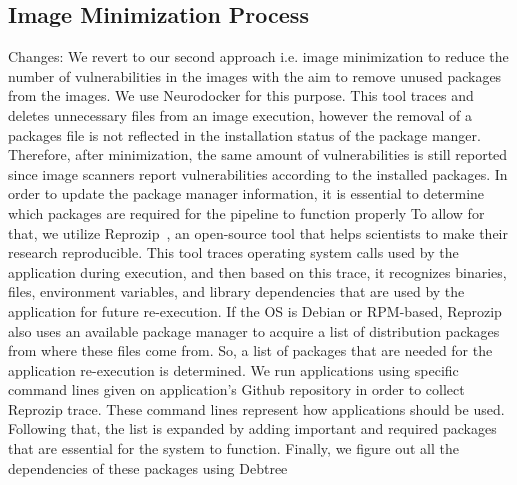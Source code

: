 \documentclass[a4paper,num-refs]{oup-contemporary}
\newcommand{\change}[2]{\color{cyan}Changes: #1\color{black}}
\begin{document}
\subsection{Image Minimization Process}

\change{We revert to our second approach i.e. image minimization to reduce the number of vulnerabilities in the
images with the aim to remove unused packages from the images.
We use Neurodocker for this purpose.
This tool traces and deletes unnecessary files from an image execution, however
the removal of a packages file is not reflected in the installation status of
the package manger.
Therefore, after minimization, the same amount of vulnerabilities is still
reported since image scanners report vulnerabilities according to the installed
packages.
In order to update the package manager information, it is essential to
determine which packages are required for the pipeline to function properly}.
To allow for that, we utilize
Reprozip~\cite{rampin2016reprozip}, an open-source tool that
helps scientists to make their research reproducible. This tool traces operating system calls used by the
application during execution, and then based on this trace, it recognizes binaries, files, environment variables,
and library dependencies that are used by the application for future re-execution. If the OS is
Debian or RPM-based, Reprozip also
uses an available package manager to acquire a list of distribution packages from where these files come from.
So, a list of packages that are needed for the application re-execution is determined. We run applications
using specific command lines given on application's Github repository in order to collect Reprozip trace.
These command lines represent how applications should be used.
Following that, the list
is expanded by adding important and required packages that are essential
for the system to function. Finally, we figure out all the dependencies of these packages using Debtree
\end{document}
